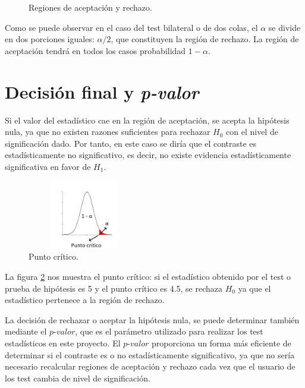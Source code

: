 \begin{figure}[h]
\centering
{}
\caption{Regiones de aceptación y rechazo.}
\label{fig:intervalos_normal}
\end{figure}

Como se puede observar en el caso del test bilateral o de dos colas, el $\alpha$ se divide en dos porciones iguales:
$\alpha / 2$, que constituyen la región de rechazo. La región de aceptación tendrá en todos los casos probabilidad
$1 - \alpha$.


\section{Decisión final y \textit{\textit{p-valor}}} \label{pvalor}
Si el valor del estadístico cae en la región de aceptación, se acepta la hipótesis nula, ya que no existen
razones suficientes para rechazar $H_0$ con el nivel de significación dado. Por tanto, en este caso se diría
que el contraste es estadísticamente no significativo, es decir, no existe evidencia estadísticamente significativa
en favor de $H_1$.
\begin{figure}[h]
\centering
\includegraphics[width=5cm,height=3cm]{figuras/critico.png}
\caption{Punto crítico.}
\label{fig:punto_critico}
\end{figure}
La figura \ref{fig:punto_critico} nos muestra el punto crítico: si el estadístico obtenido por el test o
prueba de hipótesis es 5 y el punto crítico es 4.5, se rechaza $H_0$ ya que el estadístico pertenece a la
región de rechazo.

La decisión de rechazar o aceptar la hipótesis nula, se puede determinar también mediante el $\textit{p-valor}$,
que es el parámetro utilizado para realizar los test estadísticos en este proyecto. El $\textit{p-valor}$ proporciona
un forma más eficiente de determinar si el contraste es o no estadísticamente significativo, ya que no sería
necesario recalcular regiones de aceptación y rechazo cada vez que el usuario de los test cambia de nivel de
significación.

